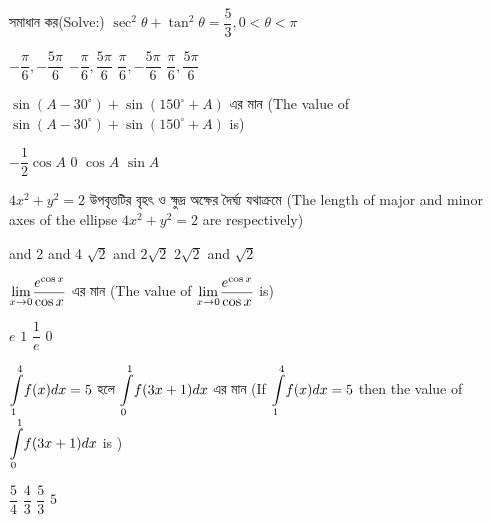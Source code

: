 \documentclass[addpoints]{exam}
\begin{document}
\begin{questions}
\begin{oneparchoices}
\end{oneparchoices}

\question  সমাধান কর(Solve:) $ \sec^{2}\theta + \tan^{2}\theta = \dfrac{5}{3}, 0<\theta<\pi $

\begin{oneparchoices}
\choice $ -\dfrac{\pi}{6}, -\dfrac{5\pi}{6} $
\choice $ -\dfrac{\pi}{6}, \dfrac{5\pi}{6} $
\choice $ \dfrac{\pi}{6}, -\dfrac{5\pi}{6} $
\choice $ \dfrac{\pi}{6}, \dfrac{5\pi}{6} $

\end{oneparchoices}

\question   $ \sin (A-30^{\circ}) + \sin (150^{\circ} +A) $ এর মান (The value of $ \sin (A-30^{\circ}) + \sin (150^{\circ} +A) $ is)

\begin{oneparchoices}
\choice $ -\dfrac{1}{2}\cos A$
\choice $ 0 $
\choice $ \cos A $
\choice $ \sin A $

\end{oneparchoices}

\question   $ 4x^{2} + y^{2} = 2 $ উপবৃত্তটির বৃহৎ ও ক্ষুদ্র অক্ষের দৈর্ঘ্য যথাক্রমে (The length of major and minor axes of the ellipse $ 4x^{2} + y^{2} = 2 $ are respectively)

\begin{oneparchoices}
 and 2
 and 4
\choice $ \sqrt{2}$ and $ 2\sqrt{2} $
\choice $ 2\sqrt{2}$ and $ \sqrt{2} $

\end{oneparchoices}

\question   $ \mathlarger{\lim_{x \to 0}} \dfrac{e^{\cos x}}{\cos x} $ এর মান (The value of $ \mathlarger{\lim_{x \to 0}} \dfrac{e^{\cos x}}{\cos x} $ is)

\begin{oneparchoices}
\choice $e$
\choice $1 $
\choice $ \dfrac{1}{e} $
\choice $ 0 $

\end{oneparchoices}


\question   $ \mathlarger{\int\limits_{1}^{4}} f(x)dx=5$ হলে $ \mathlarger{\int\limits_{0}^{1}} f(3x+1)dx$ এর মান (If $ \mathlarger{\int\limits_{1}^{4}} f(x)dx=5$ then the value of $ \mathlarger{\int\limits_{0}^{1}} f(3x+1)dx$ is )

\begin{oneparchoices}
\choice $\dfrac{5}{4}$
\choice $ \dfrac{4}{3} $
\choice $ \dfrac{5}{3} $
\choice $ 5 $

\end{oneparchoices}


\end{questions}
\end{document}
